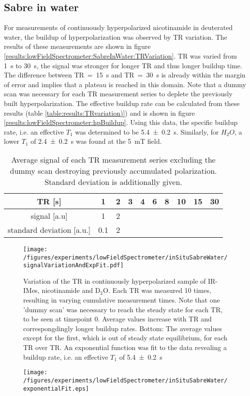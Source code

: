     \subsection{Sabre in water}
    For measurements of continuously hyperpolarized nicotinamide in deuterated water, the buildup of hyperpolarization was observed by TR variation. The results of these measurements are shown in figure \ref{results:lowFieldSpectrometer:SabreInWater:TRVariation}. TR was varied from \SI{1}{\second} to \SI{30}{\second}, the signal was stronger for longer TR and thus longer buildup time. The difference between TR~=~\SI{15}{\second} and TR~=~\SI{30}{\second} is already within the margin of error and implies that a plateau is reached in this domain. Note that a dummy scan was necessary for each TR measurement series to deplete the previously built hyperpolarization. The effective buildup rate can be calculated from these results (table \ref{table:results:TRvariation)}) and is shown in figure \ref{results:lowFieldSpectrometer:hpBuildup}. Using this data, the specific buildup rate, i.e. an effective $T_1$ was determined to be \SI{5.4\pm 0.2}{\second}. Similarly, for $H_2O$, a lower $T_1$ of \SI{2.4\pm0.2}{\second} was found at the \SI{5}{\milli\tesla} field.
        \begin{table}
            \centering
            \begin{tabular}{|c|ccccccccc|}
                \hline
                TR [s] & 1 & 2 & 3 & 4 & 6 & 8 & 10 & 15 & 30 \\
                \hline
                signal [a.u] & 1 & 2\\
                standard deviation [a.u.] & 0.1 & 2\\
                \hline
            \end{tabular}
            \label{table:results:TRvariation}
            \caption{Average signal of each TR measurement series excluding the dummy scan destroying previously accumulated polarization. Standard deviation is additionally given.}
        \end{table}
        \begin{figure}
            \texttt{[image: /figures/experiments/lowFieldSpectrometer/inSituSabreWater/signalVariationAndExpFit.pdf]}
        \caption{Variation of the TR in continuously hyperpolarized sample of IR-IMes, nicotinamide and D$_2$O. Each TR was measured 10 times, resulting in varying cumulative measurement times. Note that one 'dummy scan' was necessary to reach the steady state for each TR, to be seen at timepoint 0. Average values increase with TR and correspongdingly longer buildup rates. Bottom: The average values except for the first, which is out of steady state equilibrium, for each TR over TR. An exponential function was fit to the data revealing a buildup rate, i.e. an effective $T_1$ of \SI{5.4\pm 0.2}{\second}}
        \end{figure}
        \begin{figure}
            \centering
            \texttt{[image: /figures/experiments/lowFieldSpectrometer/inSituSabreWater/exponentialFit.eps]}
        \end{figure}
